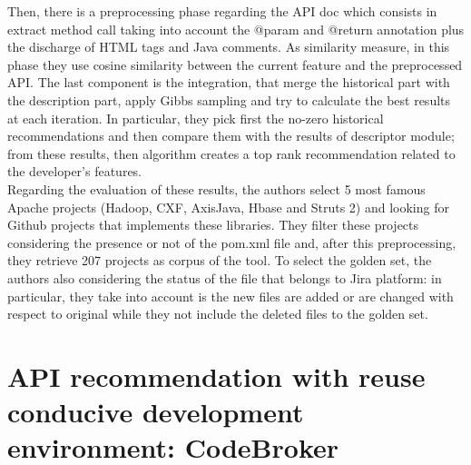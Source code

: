 Then, there is a preprocessing phase regarding the API doc which consists in extract method call taking into account the @param and @return annotation plus the discharge of HTML tags and Java comments. As similarity measure, in this phase they use cosine similarity between the current feature and the preprocessed API. The last component is the integration, that merge the historical part with the description part, apply Gibbs sampling and try to calculate the best results at each iteration. In particular, they pick first the no-zero historical recommendations and then compare them with the results of descriptor module; from these results, then algorithm creates a top rank recommendation related to the developer's features. \\
Regarding the evaluation of these results, the authors select 5 most famous Apache projects (Hadoop, CXF, AxisJava, Hbase and Struts 2) and looking for Github projects that implements these libraries. They filter these projects considering the presence or not of the pom.xml file and, after this preprocessing, they retrieve 207 projects as corpus of the tool. To select the golden set, the authors also considering the status of the file that belongs to Jira platform: in particular, they take into account is the new files are added or are changed with respect to original while they not include the deleted files to the golden set.


\section{API recommendation with reuse conducive development environment: CodeBroker}

